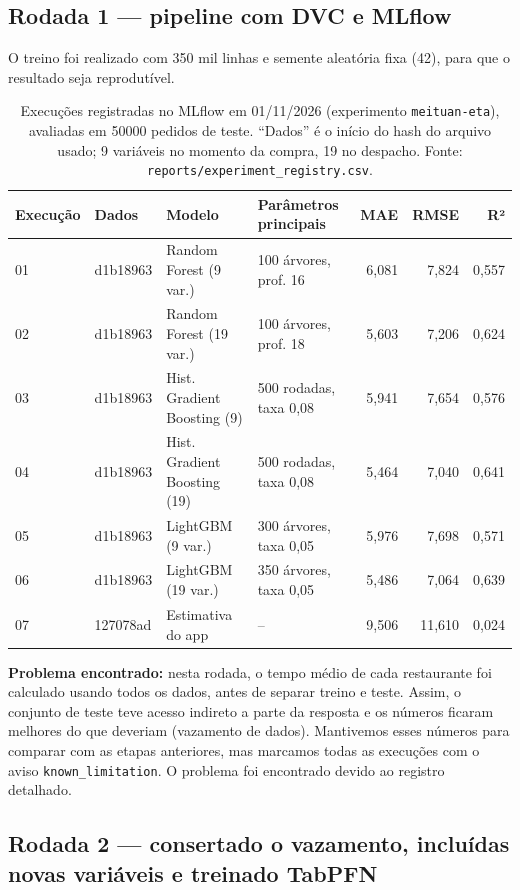 \documentclass[11pt,a4paper]{article}
\begin{document}
\subsection{Rodada 1 — pipeline com DVC e MLflow}

O treino foi realizado com 350 mil linhas e semente aleatória fixa (42), para que o resultado seja reprodutível.

\begin{table}[H]
\centering\footnotesize
\begin{tabular}{l l l l r r r}
\toprule
Execução & Dados & Modelo & Parâmetros principais & MAE & RMSE & R² \\
\midrule
01 & d1b18963 & Random Forest (9 var.) & 100 árvores, prof. 16 & 6,081 & 7,824 & 0,557 \\
02 & d1b18963 & Random Forest (19 var.) & 100 árvores, prof. 18 & 5,603 & 7,206 & 0,624 \\
03 & d1b18963 & Hist. Gradient Boosting (9) & 500 rodadas, taxa 0,08 & 5,941 & 7,654 & 0,576 \\
04 & d1b18963 & Hist. Gradient Boosting (19) & 500 rodadas, taxa 0,08 & 5,464 & 7,040 & 0,641 \\
05 & d1b18963 & LightGBM (9 var.) & 300 árvores, taxa 0,05 & 5,976 & 7,698 & 0,571 \\
06 & d1b18963 & LightGBM (19 var.) & 350 árvores, taxa 0,05 & 5,486 & 7,064 & 0,639 \\
07 & 127078ad & Estimativa do app & -- & 9,506 & 11,610 & 0,024 \\
\bottomrule
\end{tabular}
\caption{Execuções registradas no MLflow em 01/11/2026 (experimento \texttt{meituan-eta}),
avaliadas em \num{50000} pedidos de teste. ``Dados'' é o início do hash do arquivo usado;
9 variáveis no momento da compra, 19 no despacho. Fonte: \texttt{reports/experiment\_registry.csv}.}
\label{tab:r1}
\end{table}

\noindent\textbf{Problema encontrado:} nesta rodada, o tempo médio de cada restaurante foi
calculado usando todos os dados, antes de separar treino e teste. Assim, o conjunto de teste
teve acesso indireto a parte da resposta e os números ficaram melhores do que deveriam
(vazamento de dados). Mantivemos
esses números para comparar com as etapas anteriores, mas marcamos todas as execuções com o
aviso \texttt{known\_limitation}. O problema foi encontrado devido ao registro detalhado.

\subsection{Rodada 2 — consertado o vazamento, incluídas novas variáveis e treinado TabPFN}
\end{document}

